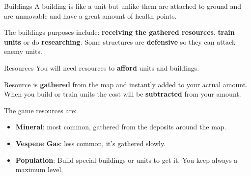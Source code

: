 \documentclass[10pt]{beamer}
\begin{document}
\begin{frame}{Buildings}
A building is like a unit but unlike them are attached to ground and are unmovable and have a great amount of health points. \newline

The buildings purposes include: \textbf{receiving the gathered resources}, \textbf{train units} or do \textbf{researching}. Some structures are \textbf{defensive} so they can attack enemy units.
\end{frame}

\begin{frame}{Resources}
    You will need resources to \textbf{afford} units and buildings.\newline

 Resource is \textbf{gathered} from the map and instantly added to your actual amount. When you build or train units the cost will be \textbf{subtracted} from your amount.\newline

    The game resources are:
    \begin{itemize}
     \item \textbf{Mineral}: most common, gathered from the deposits around the map.
     \item \textbf{Vespene Gas}: less common, it's gathered slowly.
     \item \textbf{Population}: Build special buildings or units to get it. You keep always a maximum level.
    \end{itemize}
\end{frame}
\end{document}
